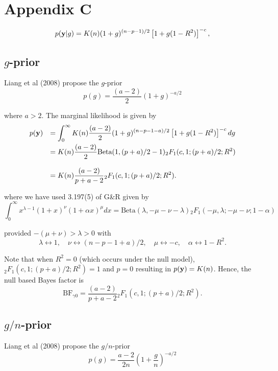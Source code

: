 \documentclass{article}[12pt]
\begin{document}
\newpage 

\section*{Appendix C}


$$
\displaystyle p({\bf y}|g)
= K(n)
(1 + g)^{(n-p-1)/2}\left[ 1 + g (1 - R^2) \right]^{-c},
$$



\subsection*{$g$-prior}

Liang et al (2008) propose the $g$-prior
$$
p(g) = \frac{(a - 2)}{2}(1 + g)^{-a/2}
$$

\noindent where $a > 2$. The marginal likelihood is given by
$$
\begin{array}{rl}
p({\bf y}) 
& \displaystyle = \int_0^\infty K(n)\frac{(a - 2)}{2} 
(1 + g)^{(n-p-1 - a)/2}\left[ 1 + g (1 - R^2) \right]^{-c}  dg
\\ [2ex]
& \displaystyle = K(n) \frac{(a - 2)}{2} \mbox{Beta}(1,(p + a)/2 - 1){}_2F_1( c, 1; (p + a)/2; R^2)
\\
\\
& \displaystyle = K(n) \frac{(a - 2)}{p + a - 2} {}_2F_1( c, 1; (p + a)/2; R^2).
\end{array} 
$$

\noindent where we have used 3.197(5) of G\&R given by
$$
\int_0^\infty x^{\lambda - 1}(1 + x)^\nu (1 + \alpha x)^\mu dx
=\mbox{Beta}(\lambda,-\mu-\nu-\lambda){}_2F_1(-\mu,\lambda;-\mu-\nu; 1 - \alpha)
$$

\noindent provided $-(\mu  + \nu) > \lambda > 0$ with
$$
\lambda \leftrightarrow 1, \quad \nu \leftrightarrow (n-p-1 + a)/2, \quad \mu \leftrightarrow -c, \quad \alpha \leftrightarrow 1- R^2.
$$

\noindent Note that when $R^2 = 0$ (which occurs under the null model),
${}_2F_1( c, 1; (p + a)/2; R^2) = 1$ and $p = 0$ resulting in
$p({\bf y}) = K(n)$. Hence, the null based Bayes factor is
$$
\mbox{BF}_{\gamma 0} = \frac{(a - 2)}{p + a - 2} {}_2F_1( c, 1; (p + a)/2; R^2).
$$

\newpage 
\subsection*{$g/n$-prior}

Liang et al (2008) propose the $g/n$-prior
$$
p(g) = \frac{a - 2}{2n}\left(1 + \frac{g}{n}\right)^{-a/2}
$$
\end{document}
